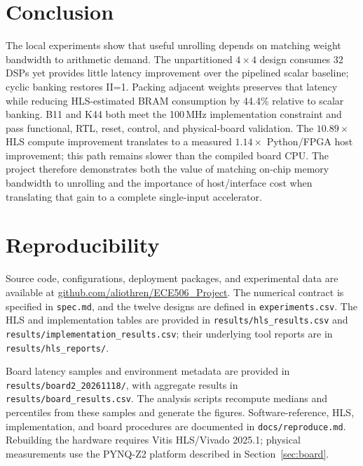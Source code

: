 \documentclass[11pt,letterpaper]{article}
\DeclareRobustCommand{\code}[1]{\nolinkurl{#1}}
\begin{document}
\section{Conclusion}
The local experiments show that useful unrolling depends on matching weight
bandwidth to arithmetic demand. The unpartitioned $4\times4$ design consumes
32 DSPs yet provides little latency improvement over the pipelined scalar
baseline; cyclic banking restores II=1. Packing adjacent weights preserves that
latency while reducing HLS-estimated BRAM consumption by 44.4\% relative to
scalar banking. B11 and K44 both meet the 100\,MHz implementation constraint and
pass functional, RTL, reset, control, and physical-board validation. The
$10.89\times$ HLS compute improvement translates to a measured $1.14\times$
Python/FPGA host improvement; this path remains slower than the compiled board
CPU. The project therefore demonstrates both the value of matching on-chip
memory bandwidth to unrolling and the importance of host/interface cost when
translating that gain to a complete single-input accelerator.

\appendix
\section{Reproducibility}
Source code, configurations, deployment packages, and experimental data are
available at
\href{https://github.com/aliothren/ECE506_Project}{github.com/aliothren/ECE506\_Project}.
The numerical contract is specified in \code{spec.md}, and the twelve designs
are defined in \code{experiments.csv}. The HLS and implementation tables are
provided in \code{results/hls_results.csv} and
\code{results/implementation_results.csv}; their underlying tool reports are
in \code{results/hls_reports/}.

Board latency samples and environment metadata are provided in
\code{results/board2_20261118/}, with aggregate results in
\code{results/board_results.csv}. The analysis scripts recompute medians and
percentiles from these samples and generate the figures. Software-reference,
HLS, implementation, and board procedures are documented in
\code{docs/reproduce.md}. Rebuilding the hardware requires Vitis HLS/Vivado
2025.1; physical measurements use the PYNQ-Z2 platform described in
Section~\ref{sec:board}.
\end{document}

